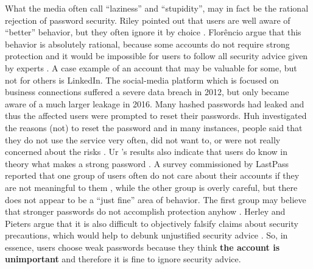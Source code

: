 	What the media often call ``laziness'' and ``stupidity'', may in fact be the rational rejection of password security. Riley pointed out that users are well aware of ``better'' behavior, but they often ignore it by choice \cite{Riley2006WhatUsersKnowWhatTheyDo}. Florêncio \etal argue that this behavior is absolutely rational, because some accounts do not require strong protection and it would be impossible for users to follow all security advice given by experts \cite{Florencio2014PasswordPortfoliosFiniteUser}. A case example of an account that may be valuable for some, but not for others is LinkedIn. The social-media platform which is focused on business connections suffered a severe data breach in 2012, but only became aware of a much larger leakage in 2016. Many hashed passwords had leaked and thus the affected users were prompted to reset their passwords. Huh \etal investigated the reasons (not) to reset the password and in many instances, people said that they do not use the service very often, did not want to, or were not really concerned about the risks \cite{Huh2017TooBusy}. Ur \etal's results also indicate that users do know in theory what makes a strong password \cite{Ur2016PerceptionsPassword}. A survey commissioned by LastPass reported that one group of users often do not care about their accounts if they are not meaningful to them \cite{LastPass2016PersonalitiesGetUsHacked}, while the other group is overly careful, but there does not appear to be a ``just fine'' area of behavior. The first group may believe that stronger passwords do not accomplish protection anyhow \cite{Florencio2007DoStrongWebPasswords}. Herley and Pieters argue that it is also difficult to objectively falsify claims about security precautions, which would help to debunk unjustified security advice \cite{Herley2015Counterfactuals}. So, in essence, users choose weak passwords because they think \textbf{the account is unimportant} and therefore it is fine to ignore security advice.  

